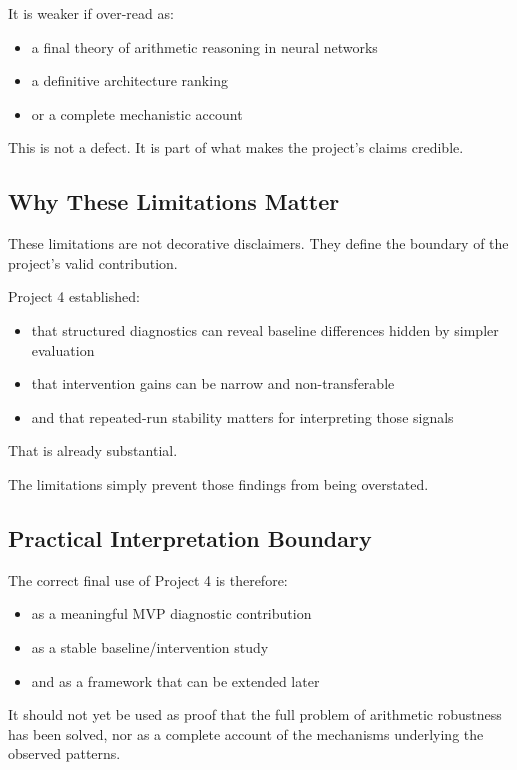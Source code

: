 \documentclass[11pt]{article}
\begin{document}
It is weaker if over-read as:
\begin{itemize}[leftmargin=1.5em]
    \item a final theory of arithmetic reasoning in neural networks
    \item a definitive architecture ranking
    \item or a complete mechanistic account
\end{itemize}

This is not a defect. It is part of what makes the project's claims credible.

\subsection{Why These Limitations Matter}

These limitations are not decorative disclaimers. They define the boundary of the project's valid contribution.

Project 4 established:
\begin{itemize}[leftmargin=1.5em]
    \item that structured diagnostics can reveal baseline differences hidden by simpler evaluation
    \item that intervention gains can be narrow and non-transferable
    \item and that repeated-run stability matters for interpreting those signals
\end{itemize}

That is already substantial.

The limitations simply prevent those findings from being overstated.

\subsection{Practical Interpretation Boundary}

The correct final use of Project 4 is therefore:
\begin{itemize}[leftmargin=1.5em]
    \item as a meaningful MVP diagnostic contribution
    \item as a stable baseline/intervention study
    \item and as a framework that can be extended later
\end{itemize}

It should not yet be used as proof that the full problem of arithmetic robustness has been solved, nor as a complete account of the mechanisms underlying the observed patterns.
\end{document}

